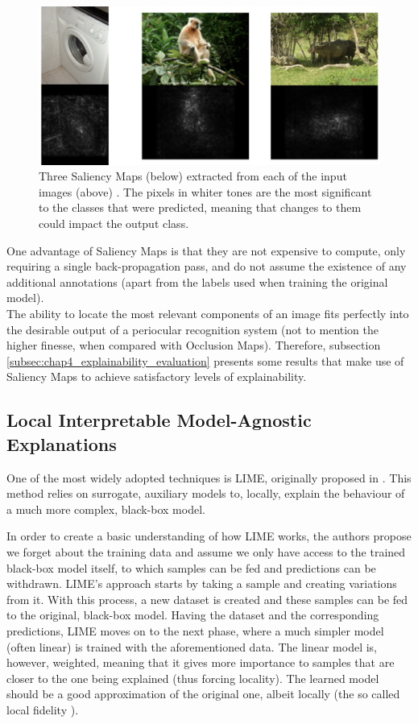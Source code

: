 \begin{figure}[h]
\centering
\includegraphics[width=370pt]{figures/figure_21.pdf}
\caption{Three Saliency Maps (below) extracted from each of the input images (above) \cite{saliency_maps}. The pixels in whiter tones are the most significant to the classes that were predicted, meaning that changes to them could impact the output class.}
\label{fig:saliency_maps}
\end{figure}

One advantage of Saliency Maps is that they are not expensive to compute, only requiring a single back-propagation pass, and do not assume the existence of any additional annotations (apart from the labels used when training the original model).\\

The ability to locate the most relevant components of an image fits perfectly into the desirable output of a periocular recognition system (not to mention the higher finesse, when compared with Occlusion Maps). Therefore, subsection \ref{subsec:chap4_explainability_evaluation} presents some results that make use of Saliency Maps to achieve satisfactory levels of explainability.

\subsection{Local Interpretable Model-Agnostic Explanations}
\label{subsec:chap2_local_interpretable_model_agnostic_explanations}
One of the most widely adopted techniques is \ac{LIME}, originally proposed in \cite{lime}. This method relies on surrogate, auxiliary models to, locally, explain the behaviour of a much more complex, black-box model. 

In order to create a basic understanding of how \ac{LIME} works, the authors propose we forget about the training data and assume we only have access to the trained black-box model itself, to which samples can be fed and predictions can be withdrawn. \ac{LIME}'s approach starts by taking a sample and creating variations from it. With this process, a new dataset is created and these samples can be fed to the original, black-box model. Having the dataset and the corresponding predictions, \ac{LIME} moves on to the next phase, where a much simpler model (often linear) is trained with the aforementioned data. The linear model is, however, weighted, meaning that it gives more importance to samples that are closer to the one being explained (thus forcing locality). The learned model should be a good approximation of the original one, albeit locally (the so called local fidelity \cite{molnar2019}).\\

